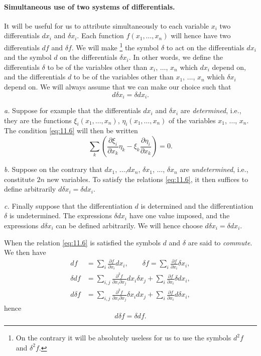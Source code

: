 \documentclass[leqno,11pt]{book}
\numberwithin{equation}{chapter}
\newcommand{\pd}{\partial}
\theoremstyle{shape1}
\theoremstyle{shapesmall}
\newcommand{\somespace}{\vspace{9pt}}
\begin{document}
\paragraph{Simultaneous use of two systems of differentials.}
\label{sec:154}
It will be useful for us to attribute simultaneously to each variable $x_{i}$ two differentials $dx_{i}$ and $\delta x_{i}$. Each function $f(x_{1},\dots,x_{n})$ will hence have two differentials $df$ and $\delta f$. We will make \footnote{On the contrary it will be absolutely useless for us to use the symbols $d^{2}f$ and $\delta^{2}f$.} the symbol $\delta$ to act on the differentials $dx_{i}$ and the symbol $d$ on the differentials $\delta x_{i}$. In other words, we define the differentials $\delta$ to be of the variables other than $x_{i}$, $\dots$, $x_{n}$ which $dx_{i}$ depend on, and the differentials $d$ to be of the variables other than $x_{1}$, $\dots$, $x_{n}$ which $\delta x_{i}$ depend on. We will always assume that we can make our choice such that
\begin{equation}
  \label{eq:11.6}
  d\delta x_{i}=\delta d x_{i}.
\end{equation}

\somespace

{\small
\emph{a.} Suppose for example that the differentials $dx_{i}$ and $\delta x_{i}$ are \emph{determined}, i.e., they are the functions $\xi_{i}(x_{1},\dots,x_{n})$, $\eta_{i}(x_{1},\dots,x_{n})$ of the variables $x_{1}$, $\dots$, $x_{n}$. The condition \eqref{eq:11.6} will then be written
\[
\sum_{k}\left(\frac{\pd \xi_{i}}{\pd x_{k}}\eta_{k}-\xi_{k}\frac{\pd \eta_{i}}{\pd x_{k}}\right)=0.
\]

\somespace

\emph{b.} Suppose on the contrary that $dx_{1}$, $\dots$,$ dx_{n}$, $\delta x_{1}$, $\dots$, $\delta x_{n}$ are \emph{undetermined}, i.e., constitute $2n$ new variables. To satisfy the relations \eqref{eq:11.6}, it then suffices to define arbitrarily $d\delta x_{i}=\delta dx_{i}$.

\somespace

\emph{c.} Finally suppose that the differentiation $d$ is determined and the differentiation $\delta$ is undetermined. The expressions $\delta dx_{i}$ have one value imposed, and the expressions $d\delta x_{i}$ can be defined arbitrarily. We will hence choose $d\delta x_{i}=\delta d x_{i}$.
}

\somespace

When the relation \eqref{eq:11.6} is satisfied the symbols $d$ and $\delta$ are said to \emph{commute}. We then have
\begin{align*}
  df&=\sum_{i}\frac{\pd f}{\pd x_{i}}dx_{i},\qquad\delta f=\sum_{i}\frac{\pd f}{\pd x_{i}}\delta x_{i},\\
  \delta df&=\sum_{i,j}\frac{\pd^{2}f}{\pd x_{i}\pd x_{j}}dx_{i}\delta x_{j}+\sum_{i}\frac{\pd f}{\pd x_{i}}\delta d x_{i},\\
  d\delta f&=\sum_{i,j}\frac{\pd^{2}f}{\pd x_{i}\pd x_{j}}\delta x_{i}d x_{j}+\sum_{i}\frac{\pd f}{\pd x_{i}}d\delta  x_{i}, 
\end{align*}
hence
\begin{equation}
  \label{eq:11.7}
  d\delta f=\delta df.
\end{equation}
\end{document}
